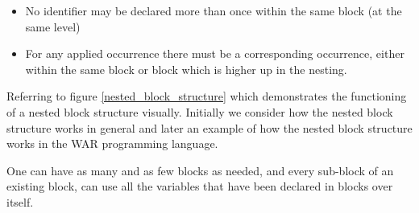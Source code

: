 	\begin{itemize}
	\item No identifier may be declared more than once within the same block (at the same level) %
	\item For any applied occurrence there must be a corresponding occurrence, either within the same block or block which is higher up in the nesting. %
	\end{itemize}
	
	
	Referring to figure \ref{nested_block_structure} which demonstrates the functioning of a nested block structure visually. Initially we consider how the nested block structure works in general and later an example of how the nested block structure works in the WAR programming language.
	
	One can have as many and as few blocks as needed, and every sub-block of an existing block, can use all the variables that have been declared in blocks over itself. 
	
	
		
\newpage
	
	
